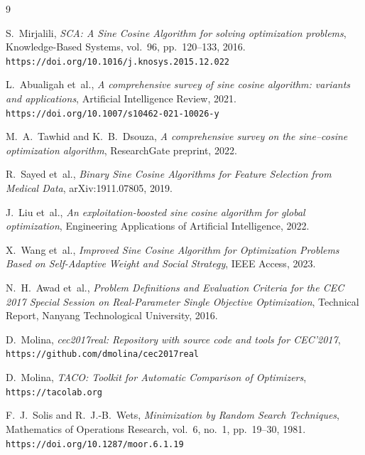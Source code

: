 \documentclass[12pt,a4paper]{article}
\begin{document}
\clearpage
{}
{}
\begin{thebibliography}{9}
 
S.~Mirjalili,
\textit{SCA: A Sine Cosine Algorithm for solving optimization problems},
Knowledge-Based Systems, vol.~96, pp.~120--133, 2016.
\texttt{https://doi.org/10.1016/j.knosys.2015.12.022}
 
L.~Abualigah et~al.,
\textit{A comprehensive survey of sine cosine algorithm: variants and applications},
Artificial Intelligence Review, 2021.
\texttt{https://doi.org/10.1007/s10462-021-10026-y}
 
M.~A.~Tawhid and K.~B.~Dsouza,
\textit{A comprehensive survey on the sine--cosine optimization algorithm},
ResearchGate preprint, 2022.
 
R.~Sayed et~al.,
\textit{Binary Sine Cosine Algorithms for Feature Selection from Medical Data},
arXiv:1911.07805, 2019.
 
J.~Liu et~al.,
\textit{An exploitation-boosted sine cosine algorithm for global optimization},
Engineering Applications of Artificial Intelligence, 2022.
 
X.~Wang et~al.,
\textit{Improved Sine Cosine Algorithm for Optimization Problems Based on Self-Adaptive Weight and Social Strategy},
IEEE Access, 2023.
 
N.~H.~Awad et~al.,
\textit{Problem Definitions and Evaluation Criteria for the CEC 2017 Special Session on Real-Parameter Single Objective Optimization},
Technical Report, Nanyang Technological University, 2016.
 
D.~Molina,
\textit{cec2017real: Repository with source code and tools for CEC'2017},
\texttt{https://github.com/dmolina/cec2017real}
 
D.~Molina,
\textit{TACO: Toolkit for Automatic Comparison of Optimizers},
\texttt{https://tacolab.org}

F.~J.~Solis and R.~J.-B.~Wets,
\textit{Minimization by Random Search Techniques},
Mathematics of Operations Research, vol.~6, no.~1, pp.~19--30, 1981.
\texttt{https://doi.org/10.1287/moor.6.1.19}
 
\end{thebibliography}
\end{document}
